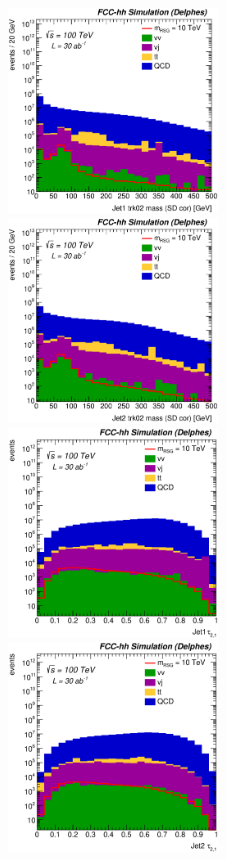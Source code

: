 \documentclass{cernrep}
\begin{document}
\begin{figure}[!htb]\centering
\includegraphics[width=0.495\textwidth]{Fig/RSGww/Jet1_trk02_SD_Cor_m_sel0_nostack_log.eps}
\includegraphics[width=0.495\textwidth]{Fig/RSGww/Jet2_trk02_SD_Cor_m_sel0_nostack_log.eps}
\includegraphics[width=0.495\textwidth]{Fig/RSGww/Jet1_tau21_sel0_nostack_log.eps}
\includegraphics[width=0.495\textwidth]{Fig/RSGww/Jet2_tau21_sel0_nostack_log.eps}

\end{figure}
\end{document}
